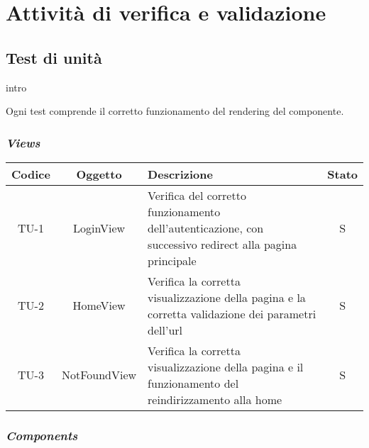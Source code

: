 \chapter{Attività di verifica e validazione}
\label{cap:verifica-validazione}


\section{Test di unità}
intro

Ogni test comprende il corretto funzionamento del rendering del componente.

\subsection*{\emph{Views}}

\begin{center}
  \label{tab:test-unita-views}
  \begin{longtable}{|c|c|p{}|c|}
  \hline
  \textbf{Codice} & \textbf{Oggetto} & \textbf{Descrizione} & \textbf{Stato}\\
  \hline
  TU-1 &LoginView &Verifica del corretto funzionamento dell'autenticazione, con successivo redirect alla pagina principale &S \\
  \hline
  TU-2 &HomeView &Verifica la corretta visualizzazione della pagina e la corretta validazione dei parametri dell'url &S \\
  \hline
  TU-3 &NotFoundView &Verifica la corretta visualizzazione della pagina e il funzionamento del reindirizzamento alla home &S \\
  \hline
\end{longtable}
\end{center}

\subsection*{\emph{Components}}

